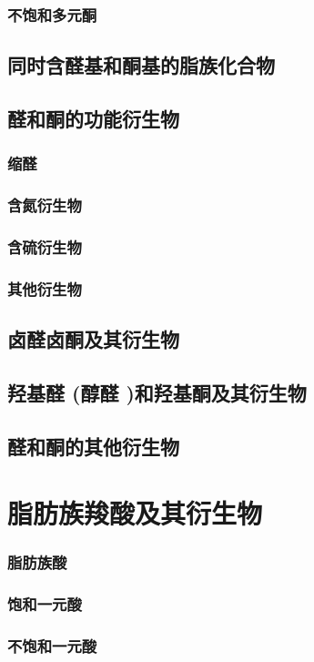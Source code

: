 \documentclass[UTF8]{../03-Chemistry}
\begin{document}
        \subsubsection{不饱和多元酮}
    \subsection{同时含醛基和酮基的脂族化合物}
    \subsection{醛和酮的功能衍生物}
        \subsubsection{缩醛}
        \subsubsection{含氮衍生物}
        \subsubsection{含硫衍生物}
        \subsubsection{其他衍生物}
    \subsection{卤醛卤酮及其衍生物}
    \subsection{羟基醛 (醇醛 )和羟基酮及其衍生物}
    \subsection{醛和酮的其他衍生物}


\section{脂肪族羧酸及其衍生物}
    \subsubsection{脂肪族酸}
        \subsubsection{饱和一元酸}
        \subsubsection{不饱和一元酸}
\end{document}
